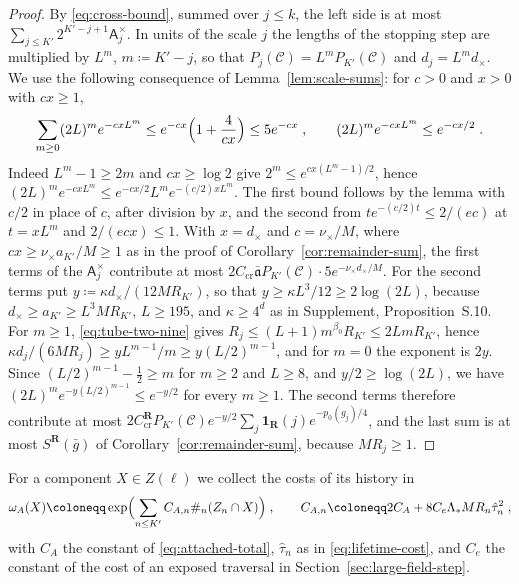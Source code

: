 \documentclass[11pt]{preprint}
\numberwithin{equation}{section}
\theoremstyle{definition}
\theoremstyle{remark}
\theoremstyle{plain}
\begin{document}
\begin{proof}
By \eqref{eq:cross-bound}, summed over $j \leq k$, the left side is at most $\sum_{j \leq K'}2^{K'-j+1}\mathsf A^\times_j$. In units of the scale $j$ the lengths of the stopping step are multiplied by $L^m$, $m \coloneqq K' - j$, so that $P_j(\mathcal C) = L^mP_{K'}(\mathcal C)$ and $d_j = L^md_\times$. We use the following consequence of Lemma~\ref{lem:scale-sums}: for $c > 0$ and $x > 0$ with $cx \geq 1$,
\begin{equation}\label{eq:doubling-sum}
    \sum_{m \geq 0}(2L)^me^{-cxL^m} \leq e^{-cx}\Bigl(1 + \frac{4}{cx}\Bigr) \leq 5e^{-cx}\;,
    \qquad
    (2L)^me^{-cxL^m} \leq e^{-cx/2}\;.
\end{equation}
Indeed $L^m - 1 \geq 2m$ and $cx \geq \log 2$ give $2^m \leq e^{cx(L^m - 1)/2}$, hence $(2L)^me^{-cxL^m} \leq e^{-cx/2}L^me^{-(c/2)xL^m}$. The first bound follows by the lemma with $c/2$ in place of $c$, after division by $x$, and the second from $te^{-(c/2)t} \leq 2/(ec)$ at $t = xL^m$ and $2/(ecx) \leq 1$. With $x = d_\times$ and $c = \nu_\times/M$, where $cx \geq \nu_\times a_{K'}/M \geq 1$ as in the proof of Corollary~\ref{cor:remainder-sum}, the first terms of the $\mathsf A^\times_j$ contribute at most $2C_{\mathrm{cr}}\bar{\mathfrak a}P_{K'}(\mathcal C) \cdot 5e^{-\nu_\times d_\times/M}$. For the second terms put $y \coloneqq \kappa d_\times/(12MR_{K'})$, so that $y \geq \kappa L^3/12 \geq 2\log(2L)$, because $d_\times \geq a_{K'} \geq L^3MR_{K'}$, $L \geq 195$, and $\kappa \geq 4^d$ as in Supplement, Proposition~S.10. For $m \geq 1$, \eqref{eq:tube-two-nine} gives $R_j \leq (L + 1)m^{\beta_0}R_{K'} \leq 2LmR_{K'}$, hence $\kappa d_j/(6MR_j) \geq yL^{m-1}/m \geq y(L/2)^{m-1}$, and for $m = 0$ the exponent is $2y$. Since $(L/2)^{m-1} - \frac12 \geq m$ for $m \geq 2$ and $L \geq 8$, and $y/2 \geq \log(2L)$, we have $(2L)^me^{-y(L/2)^{m-1}} \leq e^{-y/2}$ for every $m \geq 1$. The second terms therefore contribute at most $2C^{\mathbf R}_{\mathrm{cr}}P_{K'}(\mathcal C)e^{-y/2}\sum_j\mathbf 1_{\mathbf R}(j)e^{-p_0(g_j)/4}$, and the last sum is at most $S^{\mathbf R}(\bar g)$ of Corollary~\ref{cor:remainder-sum}, because $MR_j \geq 1$.
\end{proof}

For a component $X \in Z(\ell)$ we collect the costs of its history in
\begin{equation}\label{eq:attached-weight}
    \omega_A(X) \coloneqq \exp\Bigl(\sum_{n \leq K'}C_{A,n}\#_n(Z_n \cap X)\Bigr)\;,
    \qquad
    C_{A,n} \coloneqq 2C_A + 8C_e\Lambda_*MR_n\hat\tau_n^2\;,
\end{equation}
with $C_A$ the constant of \eqref{eq:attached-total}, $\hat\tau_n$ as in \eqref{eq:lifetime-cost}, and $C_e$ the constant of the cost of an exposed traversal in Section~\ref{sec:large-field-step}.
\end{document}
